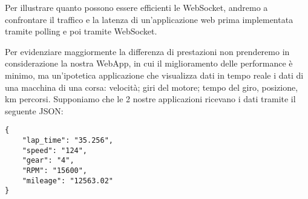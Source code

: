 Per illustrare quanto possono essere efficienti le WebSocket,
andremo a confrontare il traffico e la latenza di un'applicazione web prima implementata tramite polling e poi tramite WebSocket.

Per evidenziare maggiormente la differenza di prestazioni 
non prenderemo in considerazione la nostra WebApp, in cui il miglioramento delle performance è minimo, ma un'ipotetica applicazione che visualizza dati in tempo reale i dati
 di una macchina di una corsa: velocità; giri del motore; tempo del giro, posizione, km percorsi.
Supponiamo che le 2 nostre applicazioni ricevano i dati tramite il seguente JSON:
\begin{lstlisting}[caption={JSON dati macchina}, style=javaScriptCode]
{
	"lap_time": "35.256", 
	"speed": "124",
	"gear": "4",
	"RPM": "15600",
	"mileage": "12563.02"
}
\end{lstlisting} 

